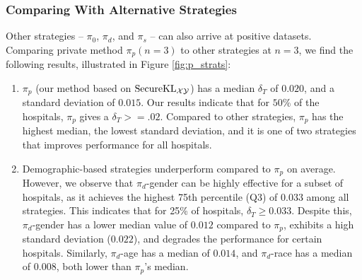 \subsubsection{Comparing With Alternative Strategies}
\label{sec:strategies_discuss}
Other strategies -- $\pi_0$, $\pi_d$, and $\pi_s$ -- can also arrive at positive datasets. Comparing private method $\pi_p(n=3)$ to other strategies at $n=3$, we find the following results, illustrated in Figure \ref{fig:p_strats}:
\begin{enumerate}
\item $\pi_p$ (our method based on $\mathrm{Secure}\mathrm{KL}_{\mathcal{X}\mathcal{Y}}$) has a median $\delta_T$ of $0.020$, and a standard deviation of $0.015$. Our results indicate that for $50$\% of the hospitals, $\pi_p$ gives a $\delta_T >= .02$. Compared to other strategies, $\pi_p$ has the highest median, the lowest standard deviation, and it is one of two strategies that improves performance for all hospitals. 

\item Demographic-based strategies underperform compared to $\pi_p$ on average. However, we observe that $\pi_d$-gender can be highly effective for a subset of hospitals, as it achieves the highest 75th percentile (Q3) of $0.033$ among all strategies. This indicates that for 25\% of hospitals, $\delta_T \geq 0.033$. Despite this, $\pi_d$-gender has a lower median value of $0.012$ compared to $\pi_p$, exhibits a high standard deviation ($0.022$), and degrades the performance for certain hospitals. Similarly, $\pi_d$-age has a median of $0.014$, and $\pi_d$-race has a median of $0.008$, both lower than $\pi_p$'s median.


\end{enumerate}
